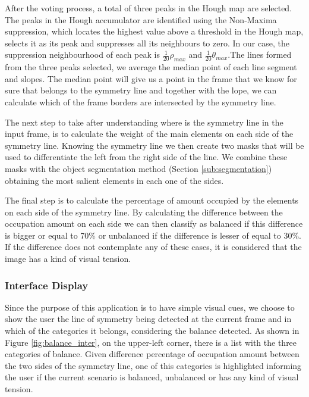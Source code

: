 \begin{description}
	After the voting process, a total of three peaks in the Hough map are selected. The peaks in the Hough accumulator are identified using the Non-Maxima suppression, which locates the highest value above a threshold in the Hough map, selects it as its peak and suppresses all its neighbours to zero. In our case, the suppression neighbourhood of each peak is $\frac{1}{20}\rho_{max}$ and $\frac{1}{20}\theta_{max}$.The lines formed from the three peaks selected, we average the median point of each line segment and slopes. The median point will give us a point in the frame that we know for sure that belongs to the symmetry line and together with the lope, we can calculate which of the frame borders are intersected by the symmetry line.
	
	The next step to take after understanding where is the symmetry line in the input frame, is to calculate the weight of the main elements on each side of the symmetry line. Knowing the symmetry line we then create two masks that will be used to differentiate the left from the right side of the line. We combine these masks with the object segmentation method (Section \ref{sub:segmentation}) obtaining the most salient elements in each one of the sides. 
	
	The final step is to calculate the percentage of amount occupied by the elements on each side of the symmetry line. By calculating the difference between the occupation amount on each side we can then classify as balanced if this difference is bigger or equal to 70\% or unbalanced if the difference is lesser of equal to 30\%. If the difference does not contemplate any of these cases, it is considered that the image has a kind of visual tension.
	
\end{description}

\subsubsection{Interface Display}

Since the purpose of this application is to have simple visual cues, we choose to show the user the line of symmetry being detected at the current frame and in which of the categories it belongs, considering the balance detected. As shown in Figure \ref{fig:balance_inter}, on the upper-left corner, there is a list with the three categories of balance. Given difference percentage of occupation amount between the two sides of the symmetry line, one of this categories is highlighted informing the user if the current scenario is balanced, unbalanced or has any kind of visual tension.

